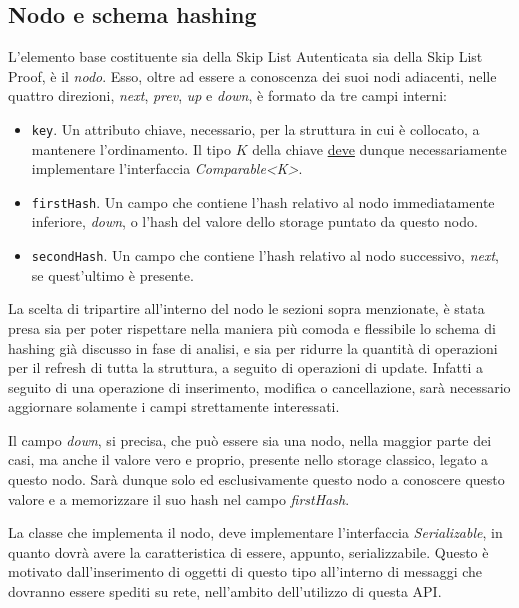 	\subsection{Nodo e schema hashing}
	
	
	L'elemento base costituente sia della Skip List Autenticata sia della Skip List Proof, è il \textit{nodo}. Esso, oltre ad essere a conoscenza dei suoi nodi adiacenti, nelle quattro direzioni, \textit{next}, \textit{prev},  \textit{up} e \textit{down}, è formato da tre campi interni:
	\begin{itemize}
		\item \verb!key!. Un attributo chiave, necessario, per la struttura in cui è collocato, a mantenere l'ordinamento. Il tipo $ K $ della chiave \underline{deve} dunque necessariamente implementare l'interfaccia \textit{Comparable<K>}.
		\item \verb!firstHash!. Un campo che contiene l'hash relativo al nodo immediatamente inferiore, \textit{down}, o l'hash del valore dello storage puntato da questo nodo.
		\item \verb!secondHash!. Un campo che contiene l'hash relativo al nodo successivo, \textit{next}, se quest'ultimo è presente.
	\end{itemize}

	La scelta di tripartire all'interno del nodo le sezioni sopra menzionate, è stata presa sia per poter rispettare nella maniera più comoda e flessibile lo schema di hashing già discusso in fase di analisi, e sia per ridurre la quantità di operazioni per il refresh di tutta la struttura, a seguito di operazioni di update. Infatti a seguito di una operazione di inserimento, modifica o cancellazione, sarà necessario aggiornare solamente i campi strettamente interessati.
	
	Il campo \textit{down}, si precisa, che può essere sia una nodo, nella maggior parte dei casi, ma anche il valore vero e proprio, presente nello storage classico, legato a questo nodo. Sarà dunque solo ed esclusivamente questo nodo a conoscere questo valore e a memorizzare il suo hash nel campo \textit{firstHash}.
	
	La classe che implementa il nodo, deve implementare l'interfaccia \textit{Serializable}, in quanto dovrà avere la caratteristica di essere, appunto, serializzabile. Questo è motivato dall'inserimento di oggetti di questo tipo all'interno di messaggi che dovranno essere spediti su rete, nell'ambito dell'utilizzo di questa API.
	

